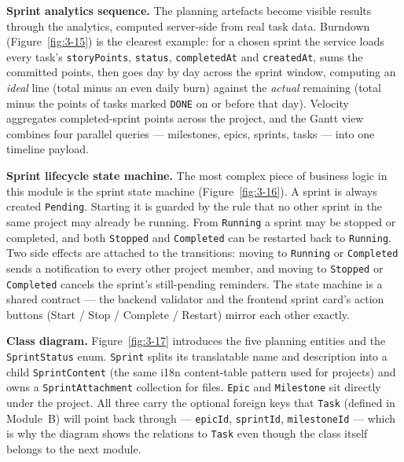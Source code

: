 
\textbf{Sprint analytics sequence.} The planning artefacts become visible results through the
analytics, computed server-side from real task data. Burndown (Figure~\ref{fig:3-15}) is the
clearest example: for a chosen sprint the service loads every task's \texttt{storyPoints},
\texttt{status}, \texttt{completedAt} and \texttt{createdAt}, sums the committed points, then
goes day by day across the sprint window, computing an \emph{ideal} line (total minus an even
daily burn) against the \emph{actual} remaining (total minus the points of tasks marked
\texttt{DONE} on or before that day). Velocity aggregates completed-sprint points across the
project, and the Gantt view combines four parallel queries --- milestones, epics, sprints,
tasks --- into one timeline payload.


\textbf{Sprint lifecycle state machine.} The most complex piece of business logic in this module
is the sprint state machine (Figure~\ref{fig:3-16}). A sprint is always created \texttt{Pending}.
Starting it is guarded by the rule that no other sprint in the same project may already be
running. From \texttt{Running} a sprint may be stopped or completed, and both \texttt{Stopped} and
\texttt{Completed} can be restarted back to \texttt{Running}. Two side effects are attached to the
transitions: moving to \texttt{Running} or \texttt{Completed} sends a notification to every
other project member, and moving to \texttt{Stopped} or \texttt{Completed} cancels the sprint's
still-pending reminders. The state machine is a shared contract --- the backend validator and the
frontend sprint card's action buttons (Start / Stop / Complete / Restart) mirror each other
exactly.


\textbf{Class diagram.} Figure~\ref{fig:3-17} introduces the five planning entities and the
\texttt{SprintStatus} enum. \texttt{Sprint} splits its translatable name and description into a
child \texttt{SprintContent} (the same i18n content-table pattern used for projects) and owns a
\texttt{SprintAttachment} collection for files. \texttt{Epic} and \texttt{Milestone} sit directly
under the project. All three carry the optional foreign keys that \texttt{Task} (defined in
Module~B) will point back through --- \texttt{epicId}, \texttt{sprintId}, \texttt{milestoneId} ---
which is why the diagram shows the relations to \texttt{Task} even though the class itself belongs to
the next module.

